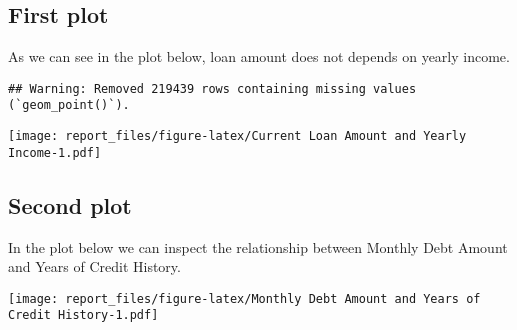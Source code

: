 \documentclass[
]{article}
\begin{document}
\hypertarget{first-plot}{%
\subsection{First plot}\label{first-plot}}

As we can see in the plot below, loan amount does not depends on yearly
income.

\begin{verbatim}
## Warning: Removed 219439 rows containing missing values (`geom_point()`).
\end{verbatim}

\texttt{[image: report\_files/figure-latex/Current Loan Amount and Yearly Income-1.pdf]}

\hypertarget{second-plot}{%
\subsection{Second plot}\label{second-plot}}

In the plot below we can inspect the relationship between Monthly Debt
Amount and Years of Credit History.

\texttt{[image: report\_files/figure-latex/Monthly Debt Amount and Years of Credit History-1.pdf]}
\end{document}
